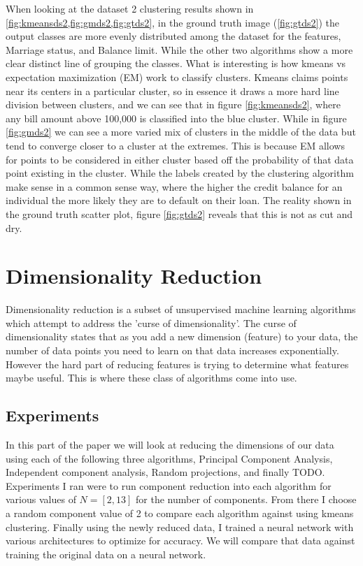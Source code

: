 \documentclass[
letterpaper, %
]{IEEEtran}
\begin{document}
	When looking at the dataset 2 clustering results shown in \cref{fig:kmeansds2,fig:gmds2,fig:gtds2}, in the ground truth image (\ref{fig:gtds2}) the output classes are more evenly distributed among the dataset for the features, Marriage status, and Balance limit. While the other two algorithms show a more clear distinct line of grouping the classes. What is interesting is how kmeans vs expectation maximization (EM) work to classify clusters. Kmeans claims points near its centers in a particular cluster, so in essence it draws a more hard line division between clusters, and we can see that in figure \ref{fig:kmeansds2}, where any bill amount above 100,000 is classified into the blue cluster. While in figure \ref{fig:gmds2} we can see a more varied mix of clusters in the middle of the data but tend to converge closer to a cluster at the extremes. This is because EM allows for points to be considered in either cluster based off the probability of that data point existing in the cluster. While the labels created by the clustering algorithm make sense in a common sense way, where the higher the credit balance for an individual the more likely they are to default on their loan. The reality shown in the ground truth scatter plot, figure \ref*{fig:gtds2} reveals that this is not as cut and dry.

	\section{Dimensionality Reduction}
	Dimensionality reduction is a subset of unsupervised machine learning algorithms which attempt to address the 'curse of dimensionality'. The curse of dimensionality states that as you add a new dimension (feature) to your data, the number of data points you need to learn on that data increases exponentially. However the hard part of reducing features is trying to determine what features maybe useful. This is where these class of algorithms come into use.
	
	\subsection{Experiments}
	In this part of the paper we will look at reducing the dimensions of our data using each of the following three algorithms, Principal Component Analysis, Independent component analysis, Random projections, and finally TODO. Experiments I ran were to run component reduction into each algorithm for various values of $N=[2, 13]$ for the number of components. From there I choose a random component value of 2 to compare each algorithm against using kmeans clustering. Finally using the newly reduced data, I trained a neural network with various architectures to optimize for accuracy. We will compare that data against training the original data on a neural network.
	
\end{document}
